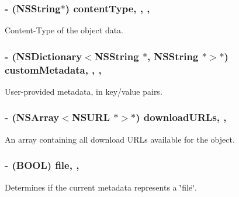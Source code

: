 \subsubsection[{content\+Type}]{\setlength{\rightskip}{0pt plus 5cm}-\/ (N\+S\+String$\ast$) content\+Type\hspace{0.3cm}{\ttfamily [read]}, {\ttfamily [write]}, {\ttfamily [nonatomic]}, {\ttfamily [copy]}}\label{interface_f_i_r_storage_metadata_aa25b5eeafc607411a4c40071e29b626e}
Content-\/\+Type of the object data. \hypertarget{interface_f_i_r_storage_metadata_a4c8c37ff4ab534e9ae422111b18b38c6}{}
\subsubsection[{custom\+Metadata}]{\setlength{\rightskip}{0pt plus 5cm}-\/ (N\+S\+Dictionary$<$N\+S\+String $\ast$, N\+S\+String $\ast$$>$$\ast$) custom\+Metadata\hspace{0.3cm}{\ttfamily [read]}, {\ttfamily [write]}, {\ttfamily [nonatomic]}, {\ttfamily [copy]}}\label{interface_f_i_r_storage_metadata_a4c8c37ff4ab534e9ae422111b18b38c6}
User-\/provided metadata, in key/value pairs. \hypertarget{interface_f_i_r_storage_metadata_ad9f8ea32b8ad163cd6fdb940fbd7a71c}{}
\subsubsection[{download\+U\+R\+Ls}]{\setlength{\rightskip}{0pt plus 5cm}-\/ (N\+S\+Array$<$N\+S\+U\+R\+L $\ast$$>$$\ast$) download\+U\+R\+Ls\hspace{0.3cm}{\ttfamily [read]}, {\ttfamily [nonatomic]}, {\ttfamily [strong]}}\label{interface_f_i_r_storage_metadata_ad9f8ea32b8ad163cd6fdb940fbd7a71c}
An array containing all download U\+R\+Ls available for the object. \hypertarget{interface_f_i_r_storage_metadata_a322014be3799e4bedf649487503fee4a}{}
\subsubsection[{file}]{\setlength{\rightskip}{0pt plus 5cm}-\/ (B\+O\+O\+L) file\hspace{0.3cm}{\ttfamily [read]}, {\ttfamily [atomic]}, {\ttfamily [assign]}}\label{interface_f_i_r_storage_metadata_a322014be3799e4bedf649487503fee4a}
Determines if the current metadata represents a \char`\"{}file\char`\"{}. \hypertarget{interface_f_i_r_storage_metadata_a99ce3b3110b480cc90a8120a70dec971}{}

